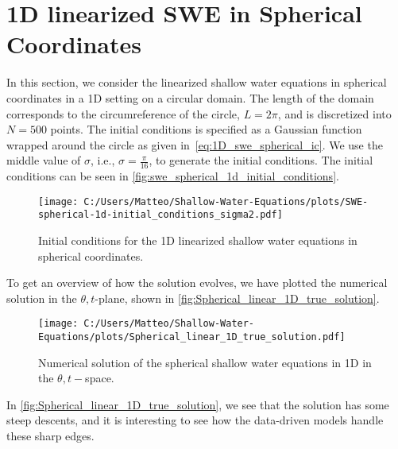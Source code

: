 \section{1D linearized SWE in Spherical Coordinates}
In this section, we consider the linearized shallow water equations in spherical coordinates in a 1D setting on a circular domain.
The length of the domain corresponds to the circumreference of the circle, $L = 2\pi$, and is discretized into $N = 500$ points.
The initial conditions is specified as a Gaussian function wrapped around the circle as given in~\eqref{eq:1D_swe_spherical_ic}.
We use the middle value of $\sigma$, i.e., $\sigma = \frac{\pi}{16}$, to generate the initial conditions.
The initial conditions can be seen in \autoref{fig:swe_spherical_1d_initial_conditions}.
\begin{figure}[H]
    \centering
    \texttt{[image: C:/Users/Matteo/Shallow-Water-Equations/plots/SWE-spherical-1d-initial\_conditions\_sigma2.pdf]}
    \caption{Initial conditions for the 1D linearized shallow water equations in spherical coordinates.}\label{fig:swe_spherical_1d_initial_conditions}
\end{figure}
To get an overview of how the solution evolves, we have plotted the numerical solution in the $\theta,t$-plane, shown in \autoref{fig:Spherical_linear_1D_true_solution}.
\begin{figure}[H]
    \centering
    \texttt{[image: C:/Users/Matteo/Shallow-Water-Equations/plots/Spherical\_linear\_1D\_true\_solution.pdf]}
    \caption{Numerical solution of the spherical shallow water equations in 1D in the $\theta,t-$space.}\label{fig:Spherical_linear_1D_true_solution}
\end{figure}
In \autoref{fig:Spherical_linear_1D_true_solution}, we see that the solution has some steep descents, and it is interesting to see how the data-driven models handle these sharp edges.

